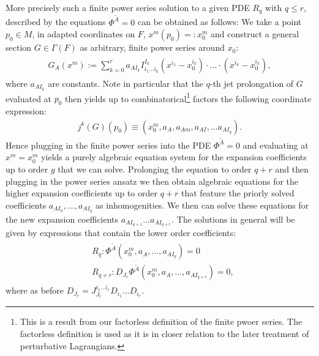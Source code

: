 \documentclass[a4paper,12pt, DIV=14, BCOR=5mm, twoside, headsepline]{scrbook}
\begin{document}
More precisely such a finite power series solution to a given PDE $R_q$ with $q\leq r$, described by the equations $\Phi^{\tilde{A}} = 0$ can be obtained as follows: We take a point $p_0 \in M$, in adapted coordinates on $F$, $x^m(p_0) =: x_0^m$ and construct a general section $G\in\Gamma(F)$ as arbitrary, finite power series around $x_0$:
\begin{align}
\begin{aligned}
    G_A(x^m) :=  \sum_{k=0}^{r} a_{AI_k}I^{I_k}_{i_1...i_k}(x^{i_1}-x_0^{i_k}) \cdot ... \cdot (x^{i_k}- x_0^{i_k}), 
\end{aligned}
\end{align}
where $a_{AI_k}$ are constants. Note in particular that the $q$-th jet prolongation of $G$ evaluated at $p_0$ then yields up to combinatorical\footnote{This is a result from our factorless definition of the finite pwoer series. The factorless definition is used as it is in closer relation to the later treatment of perturbative Lagrangians.} factors the following coordinate expression:
\begin{align}
    j^k(G)(p_0) \equiv \left ( x_0^m, a_A, a_{Am}, a_{AI}, ... a_{AI_q} \right ).
\end{align}
Hence plugging in the finite power series into the PDE $\Phi^{\tilde{A}} =0$ and evaluating at $x^m=x^m_0$ yields a purely algebraic equation system for the expansion coefficients up to order $g$ that we can solve. Prolonging the equation to order $q+r$ and then plugging in the power series ansatz we then obtain algebraic equations for the higher expansion coefficients up to order $q+r$ that feature the priorly solved coefficients $a_{AI_0},...,a_{AI_q}$ as inhomogenities. We then can solve these equations for the new expansion coefficients $a_{AI_{q+1}}...a_{AI_{q+r}}$. The solutions in general will be given by expressions that contain the lower order coefficients:
\begin{align}
\begin{aligned}
&R_q : \Phi^{\tilde{A}}(x_0^m,a_A,...,a_{AI_q}) = 0 \\
&R_{q+r} : D_{J_r}\Phi^{\tilde{A}}(x_0^m,a_A,...,a_{AI_{q+r}}) = 0,
\end{aligned}
\end{align}
where as before $D_{J_r} = J^{i_1...i_r}_{J_r} D_{i_1} ... D_{i_r}$.
\end{document}
